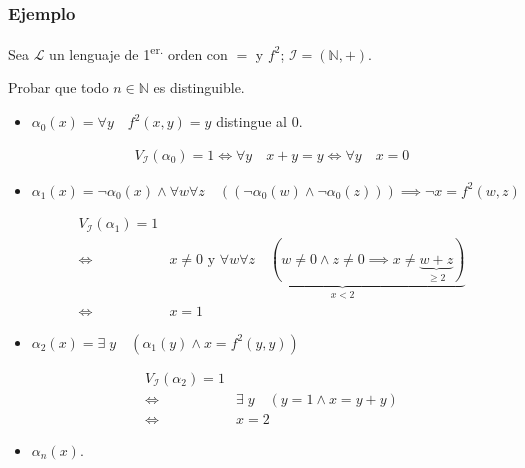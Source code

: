 \subsubsection{Ejemplo}

%
Sea $\mathcal{L}$ un lenguaje de 1\textsuperscript{er.} orden con $=$ y $f^2$;
$\mathcal{I} = (\mathbb{N}, +)$.

Probar que todo $n \in \mathbb{N}$ es distinguible.

\begin{itemize}
    \item $\alpha_0(x) = \forall y \quad f^2(x,y) = y$ distingue al $0$.

        \begin{gather*}
            V_{\mathcal{I}}(\alpha_0) = 1
            \iff \forall y \quad x + y = y 
            \iff \forall y \quad x = 0
        \end{gather*}

    \item $\alpha_1(x) = \neg \alpha_0(x) \wedge 
        \forall w \forall z \quad ((\neg \alpha_0(w) \wedge \neg \alpha_0(z))) 
        \implies \neg x = f^2(w,z)$

        \begin{align*}
            V_{\mathcal{I}}(\alpha_1) = 1 \\
            \iff & x \neq 0 \text{ y }
            \underbrace{\forall w \forall z \quad (w \neq 0 \wedge z \neq 0
            \implies x \neq \underbrace{w + z}_{\geq 2})}_{x < 2} \\
            \iff & x = 1
        \end{align*}

    \item $\alpha_2(x) = \exists \; y \quad (\alpha_1(y) \wedge x = f^2(y,y))$

        \begin{align*}
            V_{\mathcal{I}}(\alpha_2) = 1 \\
            \iff & \exists \; y \quad (y=1 \wedge x = y+y) \\
            \iff & x = 2
        \end{align*}

    \item $\alpha_n(x)$.


\end{itemize}
